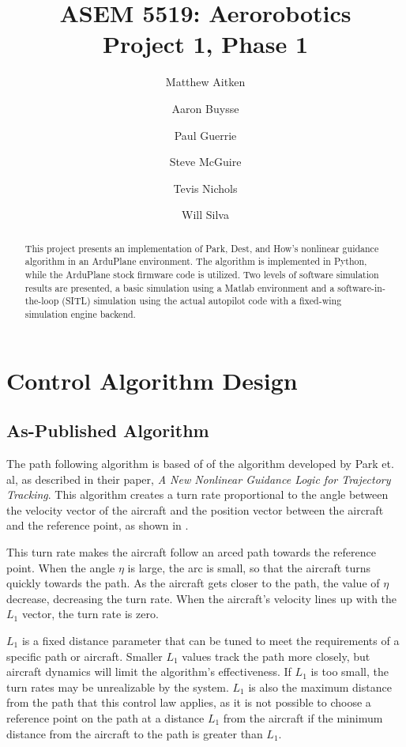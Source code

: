 \documentclass{aiaa}
\title{ASEM 5519: Aerorobotics \\ Project 1, Phase 1}
\author{Matthew Aitken \and Aaron Buysse \and Paul Guerrie \and Steve McGuire
\and Tevis Nichols \and Will Silva}
\begin{document}
\maketitle
\begin{abstract}
This project presents an implementation of Park, Dest, and How's nonlinear guidance algorithm in an ArduPlane environment. The algorithm is implemented in Python, while the ArduPlane stock firmware code is utilized. Two levels of software simulation results are presented, a basic simulation using a Matlab environment and a software-in-the-loop (SITL) simulation using the actual autopilot code with a fixed-wing simulation engine backend.
\end{abstract}

\section{Control Algorithm Design}
\subsection{As-Published Algorithm}
The path following algorithm is based of of the algorithm developed by Park et. al, as described in their paper, \textit{A New Nonlinear Guidance Logic for Trajectory Tracking}. This algorithm creates a turn rate proportional to the angle between the velocity vector of the aircraft and the position vector between the aircraft and the reference point, as shown in .

This turn rate makes the aircraft follow an arced path towards the reference point. When the angle $\eta$ is large, the arc is small, so that the aircraft turns quickly towards the path. As the aircraft gets closer to the path, the value of $\eta$ decrease, decreasing the turn rate. When the aircraft's velocity lines up with the $L_1$ vector, the turn rate is zero.

$L_1$ is a fixed distance parameter that can be tuned to meet the requirements of a specific path or aircraft. Smaller $L_1$ values track the path more closely, but aircraft dynamics will limit the algorithm's effectiveness. If $L_1$ is too small, the turn rates may be unrealizable by the system. $L_1$ is also the maximum distance from the path that this control law applies, as it is not possible to choose a reference point on the path at a distance $L_1$ from the aircraft if the minimum distance from the aircraft to the path is greater than $L_1$.
\end{document}
